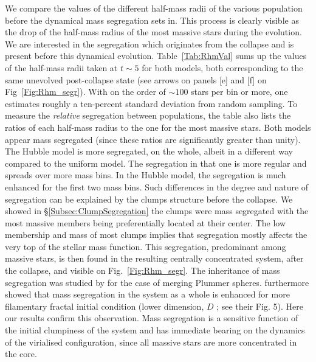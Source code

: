 We compare the values of the different half-mass radii of the various population before the dynamical mass segregation sets in. This process is clearly visible as the drop of the half-mass radius of the most massive stars during the evolution. We are interested in the segregation which originates from the collapse and is present before this dynamical evolution. Table~\ref{Tab:RhmVal} sums up the values of the half-mass radii taken at $t\sim5$ for both models, both corresponding to the same unevolved post-collapse state (see arrows on panels [e] and [f] on Fig~\ref{Fig:Rhm_segr}). With on the order of $\sim 100$ stars per bin or more, one estimates roughly a ten-percent standard deviation from random sampling. To measure the \textit{relative} segregation between populations, the table also lists the ratios of each half-mass radius to the one for the most massive stars. Both models appear mass segregated (since these ratios are significantly greater than unity). The Hubble model is more segregated, on the whole, albeit in a different way compared to the uniform model. The segregation in that one is more regular and spreads over more mass bins. In the Hubble model, the segregation is much enhanced for the first two mass bins. Such differences in the degree and nature of segregation can be explained by the clumps structure before the collapse. We showed in \S\ref{Subsec:ClumpSegregation} the clumps were mass segregated with the most massive members being preferentially located at their center. The low membership and mass of most clumps implies that segregation mostly affects the very top of the stellar mass function. This segregation, predominant among massive stars, is then found in the resulting centrally concentrated system, after the collapse, and visible on Fig.~\ref{Fig:Rhm_segr}. The inheritance of mass segregation was studied by \cite{mcmillan07} for the case of merging Plummer spheres. \cite{allison10} furthermore showed that mass segregation in the system as a whole is enhanced for more filamentary  fractal initial condition (lower dimension, $D$ ; see their Fig. 5). Here our results confirm this observation. Mass segregation is a sensitive function of the initial clumpiness of the system and has immediate bearing on the dynamics of the virialised configuration, since all massive stars are more concentrated in the core.
